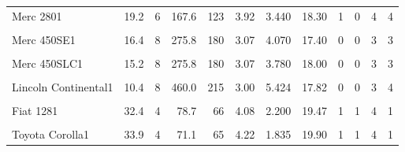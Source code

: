 \documentclass[
  10pt,
]{scrartcl}
\begin{document}
\begin{longtable}[t]{lrrrrrrrrrrr}
Merc 2801 & 19.2 & 6 & 167.6 & 123 & 3.92 & 3.440 & 18.30 & 1 & 0 & 4 & 4\\
\cellcolor{gray!10}{Merc 280C1} & \cellcolor{gray!10}{17.8} & \cellcolor{gray!10}{6} & \cellcolor{gray!10}{167.6} & \cellcolor{gray!10}{123} & \cellcolor{gray!10}{3.92} & \cellcolor{gray!10}{3.440} & \cellcolor{gray!10}{18.90} & \cellcolor{gray!10}{1} & \cellcolor{gray!10}{0} & \cellcolor{gray!10}{4} & \cellcolor{gray!10}{4}\\
Merc 450SE1 & 16.4 & 8 & 275.8 & 180 & 3.07 & 4.070 & 17.40 & 0 & 0 & 3 & 3\\
\cellcolor{gray!10}{Merc 450SL1} & \cellcolor{gray!10}{17.3} & \cellcolor{gray!10}{8} & \cellcolor{gray!10}{275.8} & \cellcolor{gray!10}{180} & \cellcolor{gray!10}{3.07} & \cellcolor{gray!10}{3.730} & \cellcolor{gray!10}{17.60} & \cellcolor{gray!10}{0} & \cellcolor{gray!10}{0} & \cellcolor{gray!10}{3} & \cellcolor{gray!10}{3}\\
\addlinespace
Merc 450SLC1 & 15.2 & 8 & 275.8 & 180 & 3.07 & 3.780 & 18.00 & 0 & 0 & 3 & 3\\
\cellcolor{gray!10}{Cadillac Fleetwood1} & \cellcolor{gray!10}{10.4} & \cellcolor{gray!10}{8} & \cellcolor{gray!10}{472.0} & \cellcolor{gray!10}{205} & \cellcolor{gray!10}{2.93} & \cellcolor{gray!10}{5.250} & \cellcolor{gray!10}{17.98} & \cellcolor{gray!10}{0} & \cellcolor{gray!10}{0} & \cellcolor{gray!10}{3} & \cellcolor{gray!10}{4}\\
Lincoln Continental1 & 10.4 & 8 & 460.0 & 215 & 3.00 & 5.424 & 17.82 & 0 & 0 & 3 & 4\\
\cellcolor{gray!10}{Chrysler Imperial1} & \cellcolor{gray!10}{14.7} & \cellcolor{gray!10}{8} & \cellcolor{gray!10}{440.0} & \cellcolor{gray!10}{230} & \cellcolor{gray!10}{3.23} & \cellcolor{gray!10}{5.345} & \cellcolor{gray!10}{17.42} & \cellcolor{gray!10}{0} & \cellcolor{gray!10}{0} & \cellcolor{gray!10}{3} & \cellcolor{gray!10}{4}\\
Fiat 1281 & 32.4 & 4 & 78.7 & 66 & 4.08 & 2.200 & 19.47 & 1 & 1 & 4 & 1\\
\addlinespace
\cellcolor{gray!10}{Honda Civic1} & \cellcolor{gray!10}{30.4} & \cellcolor{gray!10}{4} & \cellcolor{gray!10}{75.7} & \cellcolor{gray!10}{52} & \cellcolor{gray!10}{4.93} & \cellcolor{gray!10}{1.615} & \cellcolor{gray!10}{18.52} & \cellcolor{gray!10}{1} & \cellcolor{gray!10}{1} & \cellcolor{gray!10}{4} & \cellcolor{gray!10}{2}\\
Toyota Corolla1 & 33.9 & 4 & 71.1 & 65 & 4.22 & 1.835 & 19.90 & 1 & 1 & 4 & 1\\

\end{longtable}
\end{document}
